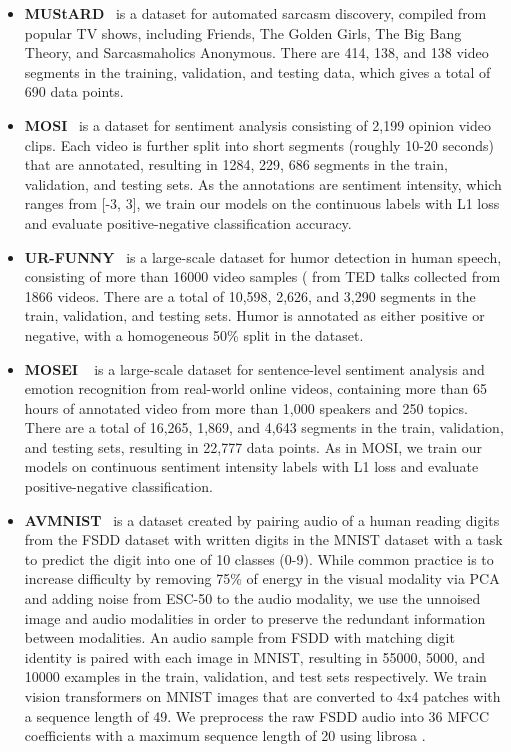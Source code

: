 \begin{itemize}
    \item \textbf{MUStARD}~\citep{castro_towards_2019} is a dataset for automated sarcasm discovery, compiled from popular TV shows, including Friends, The Golden Girls, The Big Bang Theory, and Sarcasmaholics Anonymous. There are 414, 138, and 138 video segments in the training, validation, and testing data, which gives a total of 690 data points.
    \item \textbf{MOSI}~\citep{zadeh_mosi_2016} is a dataset for sentiment analysis consisting of 2,199 opinion video clips. Each video is further split into short segments (roughly 10-20 seconds) that are annotated, resulting in 1284, 229, 686 segments in the train, validation, and testing sets. As the annotations are sentiment intensity, which ranges from [-3, 3], we train our models on the continuous labels with L1 loss and evaluate positive-negative classification accuracy.
    \item \textbf{UR-FUNNY}~\citep{hasan_ur-funny_2019}  is a large-scale dataset for humor detection in human speech, consisting of more than 16000 video samples ( from TED talks collected from 1866 videos. There are a total of 10,598, 2,626, and 3,290 segments in the train, validation, and testing sets. Humor is annotated as either positive or negative, with a homogeneous 50\% split in the dataset. 
    \item \textbf{MOSEI} ~\citep{bagher_zadeh_multimodal_2018} is a large-scale dataset for sentence-level sentiment analysis and emotion recognition from real-world online videos, containing more than 65 hours of annotated video from more than 1,000 speakers and 250 topics. There are a total of 16,265, 1,869, and 4,643 segments in the train, validation, and testing sets, resulting in 22,777 data points. As in MOSI, we train our models on continuous sentiment intensity labels with L1 loss and evaluate positive-negative classification. 
    \item \textbf{AVMNIST}~\citep{perez-rua_mfas_2019} is a dataset created by pairing audio of a human reading digits from the FSDD dataset \cite{jackson_jakobovskifree-spoken-digit-dataset_2025} with written digits in the MNIST dataset \cite{lecun_gradient-based_1998} with a task to predict the digit into one of 10 classes (0-9). While common practice \cite{perez2019mfas} is to increase difficulty by removing 75\% of energy in the visual modality via PCA and adding noise from ESC-50 to the audio modality, we use the unnoised image and audio modalities in order to preserve the redundant information between modalities. An audio sample from FSDD with matching digit identity is paired with each image in MNIST, resulting in 55000, 5000, and 10000 examples in the train, validation, and test sets respectively. We train vision transformers on MNIST images that are converted to 4x4 patches with a sequence length of 49. We preprocess the raw FSDD audio into 36 MFCC coefficients with a maximum sequence length of 20 using librosa \cite{mcfee_librosa_2015}.
  
\end{itemize}

